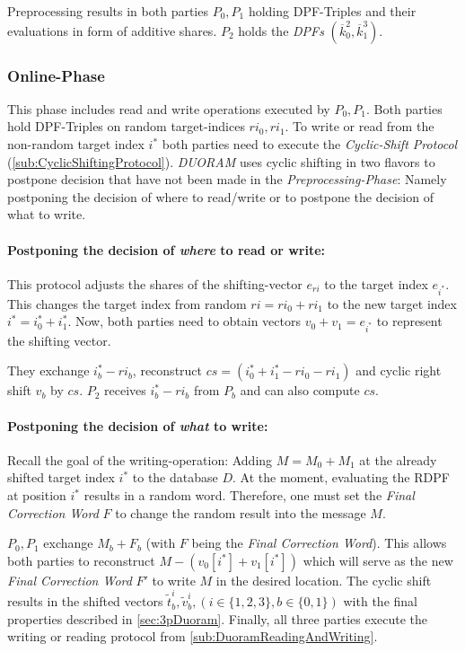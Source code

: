 Preprocessing results in both parties $P_0,P_1$ holding DPF-Triples and their evaluations in form of additive shares. 
$P_2$ holds the \textit{DPFs} $(\overline{k}_0^2, \overline{k}_1^3)$.

\subsubsection*{Online-Phase}
\label{subsub:DuoramOnlinePhase}
This phase includes read and write operations executed by $P_0,P_1$.
Both parties hold DPF-Triples on random target-indices $ri_0,ri_1$.
To write or read from the non-random target index $i^*$ both parties need to execute the \textit{Cyclic-Shift Protocol} (\ref{sub:CyclicShiftingProtocol}).
\textit{DUORAM} uses cyclic shifting in two flavors to postpone decision that have not been made in the \textit{Preprocessing-Phase}:
Namely postponing the decision of where to read/write or to postpone the decision of what to write.

\paragraph{Postponing the decision of \textit{where} to read or write:}
This protocol adjusts the shares of the shifting-vector $e_{ri}$ to the target index $e_{i^*}$.
This changes the target index from random $ri=ri_0+ri_1$ to the new target index $i^*=i^*_0+i^*_1$.
Now, both parties need to obtain vectors $v_0+v_1=e_{i^*}$ to represent the shifting vector.

They exchange $i^*_b-ri_b$, reconstruct $cs=(i_0^*+i_1^*-ri_0-ri_1)$ and cyclic right shift $v_b$ by $cs$.
$P_2$ receives $i^*_b-ri_b$ from $P_b$ and can also compute $cs$.

\paragraph{Postponing the decision of \textit{what} to write:}
Recall the goal of the writing-operation: Adding $M=M_0+M_1$ at the already shifted target index $i^*$ to the database $D$.
At the moment, evaluating the RDPF at position $i^*$ results in a random word.
Therefore, one must set the \textit{Final Correction Word} $F$ to change the random result into the message $M$.

$P_0,P_1$ exchange $M_b+F_b$ (with $F$ being the \textit{Final Correction Word}).
This allows both parties to reconstruct $M-(v_0[i^*]+v_1[i^*])$ which will serve as the new \textit{Final Correction Word} $F'$ to write $M$ in the desired location.
The cyclic shift results in the shifted vectors $\tilde{t}_b^i,\tilde{v}_b^i, (i\in\{1,2,3\},b\in\{0,1\})$ with the final properties described in \ref{sec:3pDuoram}.
Finally, all three parties execute the writing or reading protocol from \ref{sub:DuoramReadingAndWriting}.

